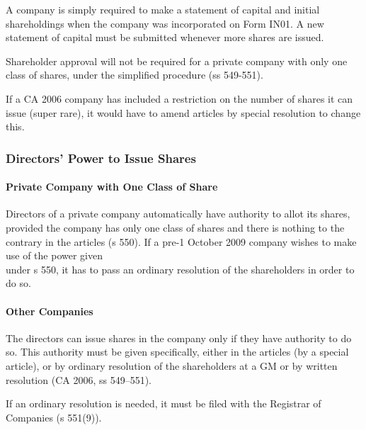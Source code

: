\documentclass[
]{article}
\newenvironment{Shaded}{}{}
\newcommand{\NormalTok}[1]{#1}
\begin{document}
A company is simply required to make a statement of capital and initial
shareholdings when the company was incorporated on Form IN01. A new
statement of capital must be submitted whenever more shares are issued.

Shareholder approval will not be required for a private company with
only one class of shares, under the simplified procedure (ss 549-551).

If a CA 2006 company has included a restriction on the number of shares
it can issue (super rare), it would have to amend articles by special
resolution to change this.

\hypertarget{directors-power-to-issue-shares}{%
\subsubsection{Directors' Power to Issue
Shares}\label{directors-power-to-issue-shares}}

\hypertarget{private-company-with-one-class-of-share}{%
\paragraph{Private Company with One Class of
Share}\label{private-company-with-one-class-of-share}}

Directors of a private company automatically have authority to allot its
shares, provided the company has only one class of shares and there is
nothing to the contrary in the articles (s 550). If a pre-1 October 2009
company wishes to make use of the power given\\
under s 550, it has to pass an ordinary resolution of the shareholders
in order to do so.

\hypertarget{other-companies}{%
\paragraph{Other Companies}\label{other-companies}}

The directors can issue shares in the company only if they have
authority to do so. This authority must be given specifically, either in
the articles (by a special article), or by ordinary resolution of the
shareholders at a GM or by written resolution (CA 2006, ss 549--551).

\begin{Shaded}
\begin{Highlighting}[]
\NormalTok{If an ordinary resolution is needed, it must be filed with the Registrar of Companies (s 551(9)). }
\end{Highlighting}
\end{Shaded}
\end{document}
